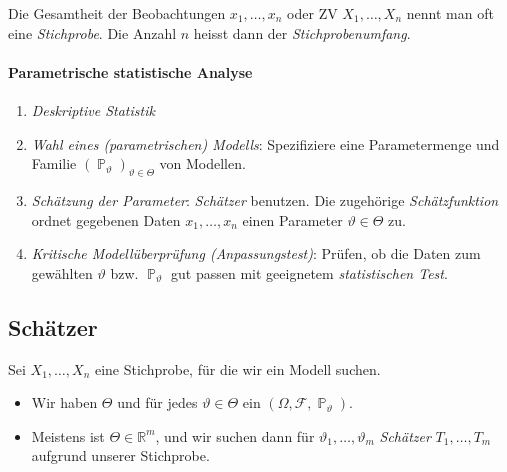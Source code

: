 \documentclass[a4paper,10pt]{article}
\def\R{\mathbb{R}}
\def\F{\mathcal{F}}
\renewcommand{\P}{\operatorname{\mathbb{P}}}
\numberwithin{equation}{section}
\begin{document}

Die Gesamtheit der Beobachtungen \( x_1, \dots, x_n \) oder ZV \( X_1, \dots, X_n \) nennt man oft eine \emph{Stichprobe}. Die Anzahl \( n \) heisst dann der \emph{Stichprobenumfang}.

\paragraph{Parametrische statistische Analyse}
\begin{enumerate}
    \item \emph{Deskriptive Statistik}
    \item \emph{Wahl eines (parametrischen) Modells}: Spezifiziere eine Parametermenge und Familie \( (\P_\vartheta)_{\vartheta \in \Theta} \) von Modellen.
    \item \emph{Schätzung der Parameter}: \emph{Schätzer} benutzen. Die zugehörige \emph{Schätzfunktion} ordnet gegebenen Daten \( x_1, \dots, x_n \) einen Parameter \( \vartheta \in \Theta \) zu.
    \item \emph{Kritische Modellüberprüfung (Anpassungstest)}: Prüfen, ob die Daten zum gewählten \( \vartheta \) bzw. \( \P_\vartheta \) gut passen mit geeignetem \emph{statistischen Test}.
\end{enumerate}

\subsection{Schätzer}

Sei \( X_1, \dots, X_n \) eine Stichprobe, für die wir ein Modell suchen.
\begin{itemize}
    \item Wir haben \( \Theta \) und für jedes \( \vartheta \in \Theta \) ein \( (\Omega, \F, \P_\vartheta) \).
    \item Meistens ist \( \Theta \in \R^m \), und wir suchen dann für \( \vartheta_1, \dots, \vartheta_m \) \emph{Schätzer} \( T_1, \dots, T_m \) aufgrund unserer Stichprobe.
\end{itemize}
\end{document}
